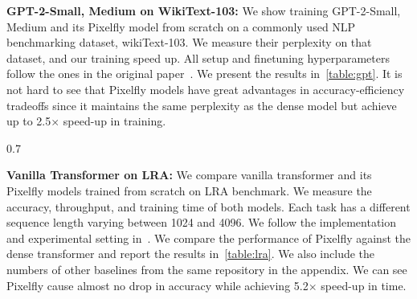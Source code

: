 \textbf{GPT-2-Small, Medium on WikiText-103:} We show training GPT-2-Small, Medium and its Pixelfly model from scratch on a commonly used NLP benchmarking dataset, wikiText-103. We measure their perplexity on that dataset, and our training speed up.
All setup and finetuning hyperparameters follow the ones in the original paper~\citep{radford2019language}. We present the results in~\cref{table:gpt}. It is not hard to see that Pixelfly models have great advantages in accuracy-efficiency tradeoffs since it maintains the same perplexity as the dense model but achieve up to 2.5$\times$ speed-up in training.

\begin{wrapfigure}{}{0.7\textwidth}
    \vspace{-0.4cm}
\captionsetup{font=small}
    \caption{The performance of Pixelfly, Reformer and vanilla transformer on Long-Range-Arena benchmarks. We measure the accuracy and training speed.\vspace{-0.3cm}}
      \centering
{}
	\label{table:lra}
	\vspace{-0.3cm}
\end{wrapfigure}
\textbf{Vanilla Transformer on LRA:} We compare vanilla transformer and its Pixelfly models trained from scratch on LRA benchmark. We measure the accuracy, throughput, and training time of both models. Each task has a different sequence length varying between 1024 and 4096.
We follow the implementation and experimental setting in~\citep{xiong2021nystr}. We compare the performance of Pixelfly against the dense transformer and report the results in~\cref{table:lra}. We also include the numbers of other baselines from the same repository in the appendix. We can see Pixelfly cause almost no drop in accuracy while achieving 5.2$\times$ speed-up in time.






